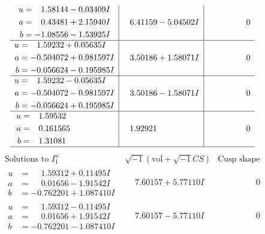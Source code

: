\documentclass[1p]{elsarticle_modified}
\theoremstyle{definition}
\newcommand{\I}{\sqrt{-1}}
\begin{document}
$$\begin{array}{c|c|c}
\begin{aligned}
u &= \phantom{-}1.58144 - 0.03409 I \\
a &= \phantom{-}0.43481 + 2.15940 I \\
b &= -1.08556 - 1.53925 I\end{aligned}
 & \phantom{-}6.41159 - 5.04502 I & \phantom{-0.000000 } 0 \\ \hline\begin{aligned}
u &= \phantom{-}1.59232 + 0.05635 I \\
a &= -0.504072 + 0.981597 I \\
b &= -0.056624 - 0.195985 I\end{aligned}
 & \phantom{-}3.50186 + 1.58071 I & \phantom{-0.000000 } 0 \\ \hline\begin{aligned}
u &= \phantom{-}1.59232 - 0.05635 I \\
a &= -0.504072 - 0.981597 I \\
b &= -0.056624 + 0.195985 I\end{aligned}
 & \phantom{-}3.50186 - 1.58071 I & \phantom{-0.000000 } 0 \\ \hline\begin{aligned}
u &= \phantom{-}1.59532\phantom{ +0.000000I} \\
a &= \phantom{-}0.161565\phantom{ +0.000000I} \\
b &= \phantom{-}1.31081\phantom{ +0.000000I}\end{aligned}
 & \phantom{-}1.92921\phantom{ +0.000000I} & \phantom{-0.000000 } 0\\
 \hline 
 \end{array}$$\newpage$$\begin{array}{c|c|c}  
\text{Solutions to }I^u_{1}& \I (\text{vol} + \sqrt{-1}CS) & \text{Cusp shape}\\
 \hline 
\begin{aligned}
u &= \phantom{-}1.59312 + 0.11495 I \\
a &= \phantom{-}0.01656 - 1.91542 I \\
b &= -0.762201 + 1.087410 I\end{aligned}
 & \phantom{-}7.60157 + 5.77110 I & \phantom{-0.000000 } 0 \\ \hline\begin{aligned}
u &= \phantom{-}1.59312 - 0.11495 I \\
a &= \phantom{-}0.01656 + 1.91542 I \\
b &= -0.762201 - 1.087410 I\end{aligned}
 & \phantom{-}7.60157 - 5.77110 I & \phantom{-0.000000 } 0 \\ \hline\begin{aligned}

\end{aligned}
\end{array}$$
\end{document}
